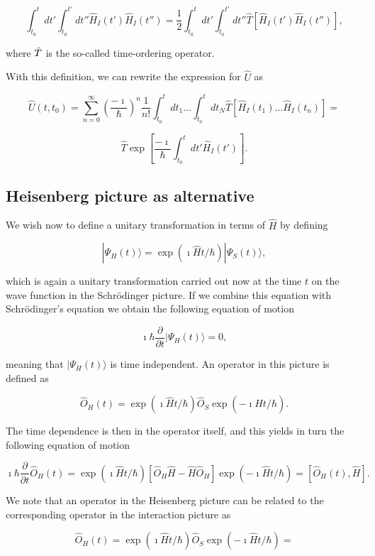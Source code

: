 \[
\int_{t_0}^t dt'\int_{t_0}^{t'} dt'' \hat{H}_I(t')\hat{H}_I(t'')=
\frac{1}{2}\int_{t_0}^t dt'\int_{t_0}^{t'} dt''\hat{T}\left[\hat{H}_I(t')\hat{H}_I(t'')\right],
\]

where $\Hat{T}$ is the so-called time-ordering operator. 




With this definition, we can rewrite the expression for $\hat{U}$ as 

\[
\hat{U}(t,t_0)=\sum_{n=0}^{\infty}\left(\frac{-\imath}{\hbar}\right)^n\frac{1}{n!}
\int_{t_0}^t dt_1\dots \int_{t_0}^t dt_N \hat{T}\left[\hat{H}_I(t_1)\dots\hat{H}_I(t_n)\right]=
\]


\[
\hat{T}\exp{\left[\frac{-\imath}{\hbar}
\int_{t_0}^t dt' \hat{H}_I(t')\right]}.
\]




\subsection{Heisenberg  picture as alternative}


We wish now to define a unitary transformation in terms of $\hat{H}$ by defining

\[
|\Psi_H(t)\rangle = \exp{(\imath\hat{H}t/\hbar)}|\Psi_S(t)\rangle,
\]

which is again a unitary transformation carried out now at the time $t$ on the 
wave function in the Schrödinger picture. If we combine this equation with 
Schrödinger's equation we obtain the following equation of motion

\[
\imath \hbar\frac{\partial }{\partial t}|\Psi_H(t)\rangle = 0,
\]

meaning that $|\Psi_H(t)\rangle$ is time independent. An operator in this picture is defined as

\[
\hat{O}_H(t)=
\exp{(\imath\hat{H}t/\hbar)}\hat{O}_S\exp{(-\imath\hat{H}t/\hbar)}.
\]



The time dependence is then in the operator itself, and this yields in turn the
following equation of motion

\[
\imath \hbar\frac{\partial }{\partial t}\hat{O}_H(t) = \exp{(\imath\hat{H}t/\hbar)}\left[\hat{O}_H\hat{H}-\hat{H}\hat{O}_H\right]\exp{(-\imath\hat{H}t/\hbar)}=\left[\hat{O}_H(t),\hat{H}\right].
\]

We note that an operator in the Heisenberg picture can be related to the corresponding
operator in the interaction picture as 

\[
\hat{O}_H(t)=
\exp{(\imath\hat{H}t/\hbar)}\hat{O}_S\exp{(-\imath\hat{H}t/\hbar)}=
\]


